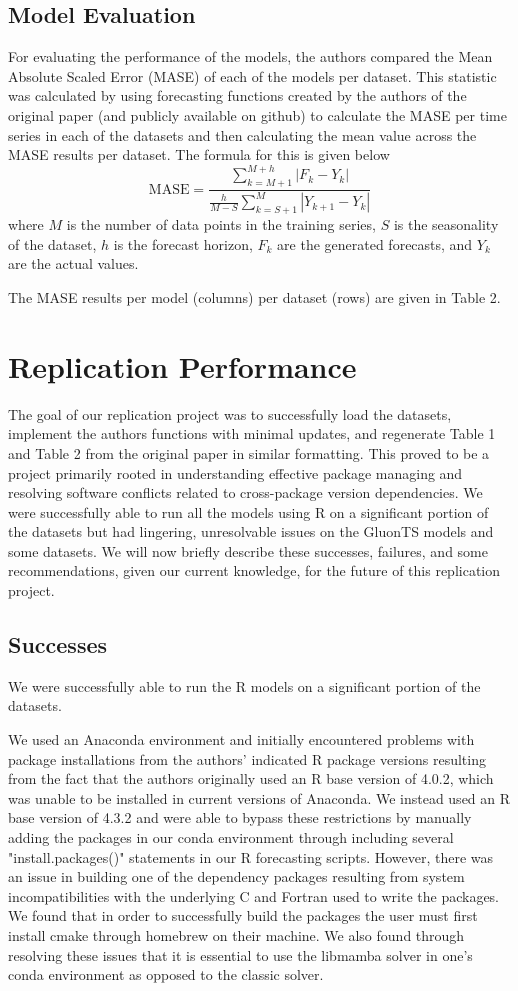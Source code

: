 \documentclass{article}
\begin{document}
\subsection{Model Evaluation}
For evaluating the performance of the models, the authors compared the Mean Absolute Scaled Error (MASE) of each of the models per dataset. This statistic was calculated by using forecasting functions created by the authors of the original paper (and publicly available on github) to calculate the MASE per time series in each of the datasets and then calculating the mean value across the MASE results per dataset. The formula for this is given below $$\text{MASE}=\frac{\sum_{k=M+1}^{M+h} |F_k-Y_k|}{\frac{h}{M-S}\sum_{k=S+1}^{M} |Y_{k+1}-Y_k|}$$
where $M$ is the number of data points in the training series, $S$ is the seasonality of the dataset, $h$ is the forecast horizon, $F_k$ are the generated forecasts, and $Y_k$ are the actual values. 

The MASE results per model (columns) per dataset (rows) are given in Table 2.

\section{Replication Performance}
The goal of our replication project was to successfully load the datasets, implement the authors functions with minimal updates, and regenerate Table 1 and Table 2 from the original paper in similar formatting. This proved to be a project primarily rooted in understanding effective package managing and resolving software conflicts related to cross-package version dependencies. We were successfully able to run all the models using R on a significant portion of the datasets but had lingering, unresolvable issues on the GluonTS models and some datasets. We will now briefly describe these successes, failures, and some recommendations, given our current knowledge, for the future of this replication project. 

\subsection{Successes}
We were successfully able to run the R models on a significant portion of the datasets. 

We used an Anaconda environment and initially encountered problems with package installations from the authors' indicated R package versions resulting from the fact that the authors originally used an R base version of 4.0.2, which was unable to be installed in current versions of Anaconda. We instead used an R base version of 4.3.2 and were able to bypass these restrictions by manually adding the packages in our conda environment through including several "install.packages()" statements in our R forecasting scripts. However, there was an issue in building one of the dependency packages resulting from system incompatibilities with the underlying C and Fortran used to write the packages. We found that in order to successfully build the packages the user must first install cmake through homebrew on their machine. We also found through resolving these issues that it is essential to use the libmamba solver in one's conda environment as opposed to the classic solver. 
\end{document}
